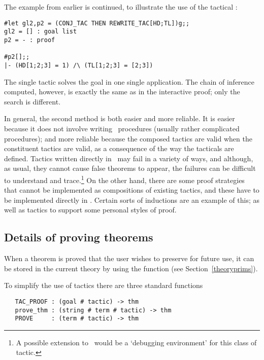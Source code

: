 The example from earlier
is continued, to illustrate the use of the tactical :

\begin{session}\begin{verbatim}
#let gl2,p2 = (CONJ_TAC THEN REWRITE_TAC[HD;TL])g;;
gl2 = [] : goal list
p2 = - : proof

#p2[];;
|- (HD[1;2;3] = 1) /\ (TL[1;2;3] = [2;3])
\end{verbatim}\end{session}

\noindent The single tactic 
solves the goal in one single application. The chain of inference computed,
however, is exactly the same as in the interactive proof; only the search is
different.

In general, the second method is both easier and more reliable.  It is
easier because it does not involve writing \ML\ procedures (usually
rather complicated procedures); and more reliable because
the composed tactics are valid
 when the constituent tactics are valid,
as a consequence of the way the tacticals are defined. Tactics written
directly in \ML\ may fail
 in a variety of ways, and although, as usual,
they cannot cause false theorems to appear, the failures can be difficult
to understand and trace.\footnote{A possible extension to \HOL\
would be a `debugging environment' for this class of tactic.} On the other
hand, there are some proof strategies that cannot be implemented as
compositions of existing tactics, and these have to be implemented
directly in \ML.  Certain sorts of inductions are an example of this;
as well as tactics to support some personal styles of proof.



\subsection{Details of proving theorems}
\label{using-tactics}

When a theorem is proved that the user wishes to preserve for future use,
it can be stored in the current theory
by using the function  (see Section~\ref{theoryprims}).

To simplify the use of tactics there are three standard functions

\begin{boxed}\begin{verbatim}
   TAC_PROOF : (goal # tactic) -> thm
   prove_thm : (string # term # tactic) -> thm
   PROVE     : (term # tactic) -> thm
\end{verbatim}\end{boxed}

